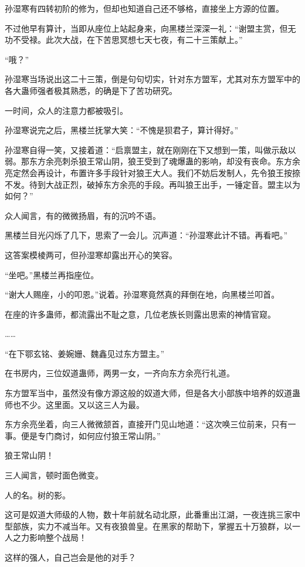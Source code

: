 \begin{this_body}
孙湿寒有四转初阶的修为，但却也知道自己还不够格，直接坐上方源的位置。

不过他早有算计，当即从座位上站起身来，向黑楼兰深深一礼：“谢盟主赏，但无功不受禄。此次大战，在下苦思冥想七天七夜，有二十三策献上。”

“哦？”

孙湿寒当场说出这二十三策，倒是句句切实，针对东方盟军，尤其对东方盟军中的各大蛊师强者极其熟悉，的确是下了苦功研究。

一时间，众人的注意力都被吸引。

孙湿寒说完之后，黑楼兰抚掌大笑：“不愧是狈君子，算计得好。”

孙湿寒自得一笑，又接着道：“启禀盟主，就在刚刚在下又想到一策，叫做示敌以弱。那东方余亮刺杀狼王常山阴，狼王受到了魂爆蛊的影响，却没有丧命。东方余亮定然会再设计，布置许多手段针对狼王大人。我们不妨后发制人，先令狼王按捺不发。待到大战正烈，破掉东方余亮的手段。再叫狼王出手，一锤定音。盟主以为如何？”

众人闻言，有的微微扬眉，有的沉吟不语。

黑楼兰目光闪烁了几下，思索了一会儿。沉声道：“孙湿寒此计不错。再看吧。”

这答案模棱两可，但孙湿寒却露出开心的笑容。

“坐吧。”黑楼兰再指座位。

“谢大人赐座，小的叩恩。”说着。孙湿寒竟然真的拜倒在地，向黑楼兰叩首。

在座的许多蛊师，都流露出不耻之意，几位老族长则露出思索的神情官窥。

……

“在下鄂玄铭、姜婉姗、魏鑫见过东方盟主。”

在书房内，三位奴道蛊师，两男一女，一齐向东方余亮行礼道。

东方盟军当中，虽然没有像方源这般的奴道大师，但是各大小部族中培养的奴道蛊师也不少。这里面。又以这三人为最。

东方余亮坐着，向三人微微颔首，直接开门见山地道：“这次唤三位前来，只有一事。便是专门商讨，如何应付狼王常山阴。”

狼王常山阴！

三人闻言，顿时面色微变。

人的名。树的影。

这可是奴道大师级的人物，数十年前就名动北原，此番重出江湖，一夜连挑三家中型部族，实力不减当年。又有夜狼兽皇。在黑家的帮助下，掌握五十万狼群，以一人之力影响整个战局！

这样的强人，自己岂会是他的对手？


\end{this_body}
